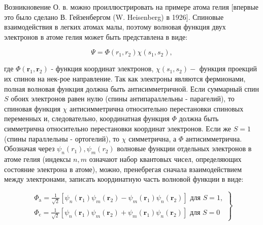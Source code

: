 \documentclass[10pt]{article}
\begin{document}
Возникновение О. в. можно проиллюстрировать на примере атома гелия [впервые это было сделано В. Гейзенбергом (W. Heisenberg) в 1926]. Спиновые взаимодействия в легких атомах малы, поэтому волновая функция двух электронов в атоме гелия может быть представлена в виде:



\[

\Psi=\Phi\left(r_{1}, r_{2}\right) \chi\left(s_{1}, s_{2}\right),

\]



где $\Phi\left(\boldsymbol{r}_{1}, \boldsymbol{r}_{2}\right)$ - функция координат электронов, $\chi\left(s_{1}, s_{2}\right)-$ функция проекций их спинов на нек-рое направление. Так как электроны являются фермионами, полная волновая функция должна быть антисимметричной. Если суммарный спин $S$ обоих электронов равен нулю (спины антипараллельны - парагелий), то спиновая функция $\chi$ антисимметрична относительно перестановки спиновых переменных и, следовательно, координатная функция $\Phi$ должна быть симметрична относительно перестановки координат электронов. Если же $S=1$ (спины параллельны - ортогелий), то $\chi$ симметрична, а $\Phi$ антисимметрична. Обозначая через $\psi_{n}\left(r_{1}\right), \psi_{m}\left(r_{2}\right)$ волновые функции отдельных электронов в атоме гелия (индексы $n, m$ означают набор квантовых чисел, определяющих состояние электрона в атоме), можно, пренебрегая сначала взаимодействием между электронами, записать координатную часть волновой функции в виде:



\[

\left.\begin{array}{l}

\Phi_{\mathrm{a}}=\frac{1}{\sqrt{2}}\left[\psi_{n}\left(\boldsymbol{r}_{1}\right) \psi_{m}\left(\boldsymbol{r}_{2}\right)-\psi_{m}\left(\boldsymbol{r}_{1}\right) \psi_{n}\left(\boldsymbol{r}_{2}\right)\right] \text { для } S=1, \\

\Phi_{\mathrm{c}}=\frac{1}{\sqrt{2}}\left[\psi_{n}\left(\boldsymbol{r}_{1}\right) \psi_{m}\left(\boldsymbol{r}_{2}\right)+\psi_{m}\left(\boldsymbol{r}_{1}\right) \psi_{n}\left(\boldsymbol{r}_{2}\right)\right] \text { для } S=0

\end{array}\right\}

\]
\end{document}

